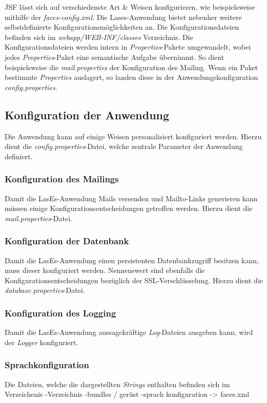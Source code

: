 JSF lässt sich auf verschiedenste Art \& Weisen konfigurieren, wie beispielsweise
mithilfe der \emph{faces-config.xml}.
Die Lases-Anwendung bietet nebenher weitere selbstdefinierte Konfigurationsmöglichkeiten an.
Die Konfigurationsdateien befinden sich im \emph{webapp/WEB-INF/classes} Verzeichnis.
Die Konfigurationsdateien werden intern in \emph{Properties}-Pakete umgewandelt,
wobei jedes \emph{Properties}-Paket eine semantische Aufgabe übernimmt.
So dient beispielsweise die \emph{mail.properties} der Konfiguration des Mailing.
Wenn ein Paket bestimmte \emph{Properties} auslagert,
so landen diese in der Anwendungskonfiguration \emph{config.properties}.

\subsection{Konfiguration der Anwendung}
Die Anwendung kann auf einige Weisen personalisiert konfiguriert werden.
Hierzu dient die \emph{config.properties}-Datei,  %
welche zentrale Parameter der Anwendung definiert.

\subsubsection{Konfiguration des Mailings}
Damit die LasEs-Anwendung Mails versenden und Mailto-Links generieren kann
müssen einige Konfigurationsentscheidungen getroffen werden.
Hierzu dient die \emph{mail.properties}-Datei.

\subsubsection{Konfiguration der Datenbank}
Damit die LasEs-Anwendung einen persistenten Datenbankzugriff besitzen kann,
muss dieser konfiguriert werden. Nennenswert sind ebenfalls die
Konfigurationsentscheidungen bezüglich der SSL-Verschlüsselung.
Hierzu dient die \emph{database.properties}-Datei.

\subsubsection{Konfiguration des Logging}
Damit die LasEs-Anwendung aussagekräftige \emph{Log}-Dateien ausgeben kann,
wird der \emph{Logger} konfiguriert.

\subsubsection{Sprachkonfiguration}
Die Dateien, welche die dargestellten \emph{Strings} enthalten befinden sich im
Verzeichenis
-Verzeichnis
-bundles / gerüst
-sprach konfiguration -> faces.xml